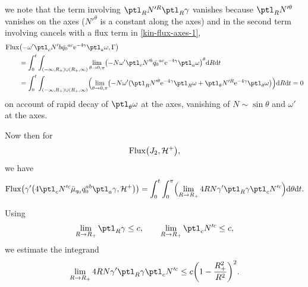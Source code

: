 we note that the term involving $ \ptl_R N'^R \ptl_R \gamma $ vanishes because $\ptl_R N'^\theta$ vanishes on the axes \big($N'^\theta $ is a constant along the axes\big)
and in the second term involving  cancels with a flux term in \eqref{kin-flux-axes-1},
\begin{align*}
& {\rm Flux} \bigl(-\omega' \ptl_c N'b \bar{q_0}^{ac} {\rm e}^{-4\gamma} \ptl_a \omega, \Gamma\bigr) \notag\\
&\qquad{}= \int^t_0 \int_{ (-\infty, R_+) \cup (R_+, \infty) } \lim_{\theta \to 0, \pi} \bigl(
-N \omega' \ptl_c N'^b \bar{q_0}^{ac} {\rm e}^{-4\gamma} \ptl_a \omega \bigr)^\theta {\rm d}R {\rm d}t \notag\\
&\qquad{}= \int^t_0 \int_{ (-\infty, R_+) \cup (R_+, \infty) } \Bigl(\lim_{\theta \to 0, \pi} \bigl(- N \omega' (\ptl_R N'^ \theta {\rm e}^{-4\gamma} \ptl_R \omega + \ptl_\theta N'^ R {\rm e}^{-4 \gamma} \ptl_\theta \omega\bigr) \Bigr) {\rm d}R {\rm d}t
=0
\end{align*}
on account of rapid decay of $\ptl_\theta \omega$ at the axes, vanishing of $N \sim \sin \theta $ and $\omega'$ at the axes.

Now then for
\begin{align*}
{\rm Flux} \bigl(J_2, \mathcal{H}^+\bigr),
\end{align*}
we have
\begin{align*}
{\rm Flux} \bigl(\gamma' \bigl(4 \ptl_c N'^c \bar{\mu}_{q_0} q^{ab} _0 \ptl_a \gamma, \mathcal{H}^+\bigr)\bigr)
= \int^t_0 \int^\pi_0 \Bigl(\lim_{R \to R_+} 4 R N \gamma' \ptl_R \gamma \ptl_c N'^c\Bigr) {\rm d} \theta {\rm d}t.
\end{align*}

Using
\begin{align*}
\lim_{R \to R_+} \ptl_R \gamma \leq c, \qquad \lim_{R \to R_+} \ptl_c N'^c \leq c,
\end{align*}
 we estimate the integrand
\begin{align*}
\lim_{R \to R_+} 4 R N \gamma' \ptl_R \gamma \ptl_c N'^c \leq c \biggl(1- \frac{R^2_+}{R^2}\biggr)^2.
\end{align*}

